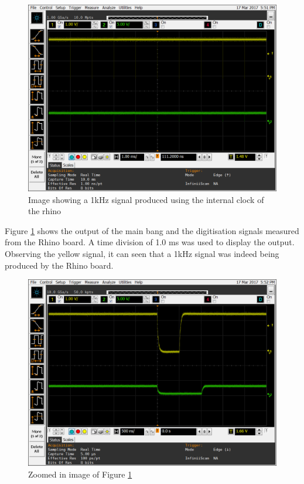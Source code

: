 \documentclass[12pt, a4paper]{article}
\begin{document}
	\begin{figure}[h!]
		\centering
		\includegraphics[width=13cm]{1khz_mb_offset_500_ns}
		\caption{Image showing a 1kHz signal produced using the internal clock of the rhino}
		\label{fig:1kHz_in_500_offset}
	\end{figure}
	
Figure \ref{fig:1kHz_in_500_offset} shows the output of the main bang and the digitisation signals measured from the Rhino board. A time division of 1.0 ms was used to display the output. Observing the yellow signal, it can seen that a 1kHz signal was indeed being produced by the Rhino board.

	\begin{figure}[t]
		\centering
		\includegraphics[width=13cm]{1khz_mb_offset_500_ns_length_of_offset}
		\caption{Zoomed in image of Figure \ref{fig:1kHz_in_500_offset}}
		\label{fig:1kHz_in_500_offset_zoom}
	\end{figure}
		
\end{document}
